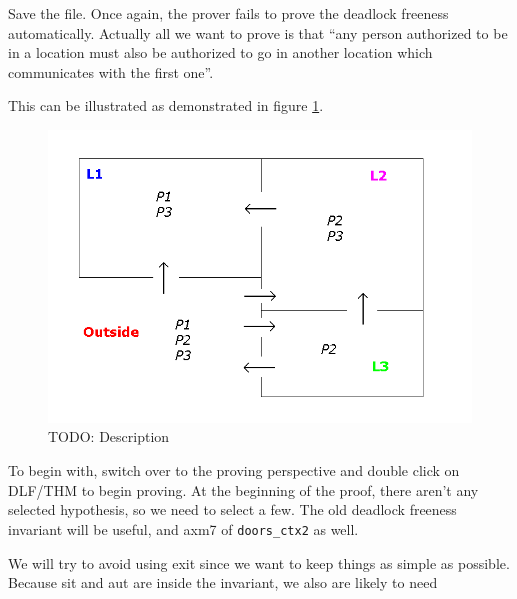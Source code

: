 Save the file. Once again, the prover fails to prove the deadlock freeness automatically. Actually all we want to prove is that ``any person authorized to be in a location must also be authorized to go in another location which communicates with the first one''.

This can be illustrated as demonstrated in figure \ref{fig_tut_10_graph}.

\begin{figure}[!h]
\begin{center}
	\includegraphics[]{img/tutorial/tut_10_graph.png}
	\caption{TODO: Description}
	\label{fig_tut_10_graph}
\end{center}
\end{figure}

To begin with, switch over to the proving perspective and double click on \textsf{DLF/THM} to begin proving. At the beginning of the proof, there aren't any selected hypothesis, so we need to select a few. The old deadlock freeness invariant will be useful, and \textsf{axm7} of \texttt{doors\_ctx2} as well. 

\begin{description}
\AXIOMS
	\begin{description}
	\end{description}
\end{description}

We will try to avoid using \textsf{exit} since we want to keep things as simple as possible. Because \textsf{sit} and \textsf{aut} are inside the invariant, we also are likely to need 

